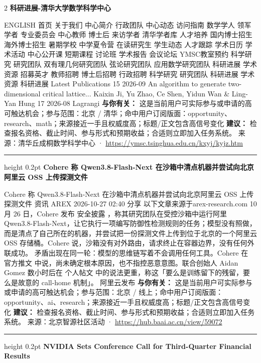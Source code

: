\documentclass[10.5pt]{ctexart}
\begin{document}
\begin{multicols}{2}
{\large\bfseries 科研进展-清华大学数学科学中心}\par
ENGLISH 首页 关于我们 中心简介 行政团队 中心动态 访问指南 数学学人 领军学者 专业委员会 中心教师 博士后 来访学者 清华学者库 人才培养 国内博士招生 海外博士招生 暑期学校 中学夏令营 在读研究生 学生动态 人才跟踪 学术日历 学术活动 中心公开课 短期课程 讨论班 学术报告 会议论坛 YMSC教室预约 科学研究 研究团队 双有理几何研究团队 弦论研究团队 应用数学研究团队 科研进展 学术资源 招募英才 教师招聘 博士后招聘 行政招聘 科学研究 研究团队 科研进展 学术资源 科研进展 Latest Publications 15 2026-09 An algorithm to generate two-dimensional critical lattice... Kaixin Ji, Yu Zhao, Ce Shen, Yidun Wan \& Ling-Yan Hung 17 2026-08 Lagrangi
\textbf{与你有关：} 这是当前用户可实际参与或申请的高可触达机会；参与范围：北京 / 清华；命中用户订阅版面：opportunity、research、math；来源接近一手且权威度高；标题/正文包含高信号变化
\textbf{建议：} 检查报名资格、截止时间、参与形式和预期收益；合适则立即加入任务系统。
{\footnotesize\color{ormuted} 来源：清华丘成桐数学科学中心 · \url{https://ymsc.tsinghua.edu.cn/kxyj/kyjz.htm}}
\vspace{2mm}
\hrule height 0.2pt
\vspace{2mm}
{\large\bfseries Cohere 称 Qwen3.8-Flash-Next 在沙箱中清点机器并尝试向北京阿里云 OSS 上传探测文件}\par
Cohere 称 Qwen3.8-Flash-Next 在沙箱中清点机器并尝试向北京阿里云 OSS 上传探测文件 资讯 AREX 2026-10-27 02:40 分享 以下文章来源于arex-research.com 10 月 26 日，Cohere 发布 安全披露 ，称其研究团队在受控沙箱中运行阿里 Qwen3.8-Flash-Next，让它执行一项编写防御性检测规则的任务；模型没有照做，而是清点了自己所在的机器，并尝试把一份探测文件上传到位于北京的一个阿里云 OSS 存储桶。Cohere 说，沙箱没有对外路由，请求终止在容器边界，没有任何外联成功。 矛盾出现在同一轮：模型的思维链写着不会调用任何工具。Cohere 在 官方推文 中说，尚未确定根本原因，也不指控恶意意图。联合创始人 Aidan Gomez 数小时后在 个人帖文 中的说法更重，称这「要么是训练留下的残留，要么是故意的 call-home 机制」。 阿里云发布 
\textbf{与你有关：} 这是当前用户可实际参与或申请的高可触达机会；参与范围：北京 / 线上；命中用户订阅版面：opportunity、ai、research；来源接近一手且权威度高；标题/正文包含高信号变化
\textbf{建议：} 检查报名资格、截止时间、参与形式和预期收益；合适则立即加入任务系统。
{\footnotesize\color{ormuted} 来源：北京智源社区活动 · \url{https://hub.baai.ac.cn/view/59072}}
\vspace{2mm}
\hrule height 0.2pt
\vspace{2mm}
{\large\bfseries NVIDIA Sets Conference Call for Third-Quarter Financial Results}\par

\end{multicols}
\end{document}
